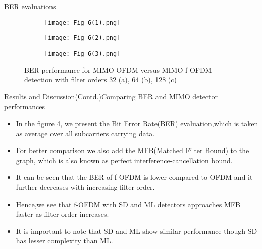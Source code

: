 \documentclass{beamer}
\begin{document}
\begin{frame}{BER evaluations}
    \begin{figure}
        \centering
        \begin{subfigure}[b]{0.3\textwidth}
         \centering
         \texttt{[image: Fig 6(1).png]}
         \caption{}
         \label{fig:6(1)}
        \end{subfigure}
        \hfill
        \begin{subfigure}[b]{0.3\textwidth}
         \centering
         \texttt{[image: Fig 6(2).png]}
         \caption{}
         \label{fig:6(2)}
        \end{subfigure}
        \hfill
        \begin{subfigure}[b]{0.3\textwidth}
         \centering
         \texttt{[image: Fig 6(3).png]}
         \caption{}
         \label{fig:6(3)}
        \end{subfigure}
        \caption{BER performance for MIMO OFDM versus MIMO f-OFDM detection with filter orders 32 (a), 64 (b), 128 (c)}
        \label{fig: 6}
    \end{figure}
\end{frame}
\begin{frame}{Results and Discussion(Contd.)}{Comparing BER and MIMO detector performances}
\begin{itemize}
    \item In the figure \ref{fig: 6}, we present the Bit Error Rate(BER) evaluation,which is taken as average over all subcarriers carrying data.
    \item For better comparison we also add the MFB(Matched Filter Bound) to the graph, which is also known as perfect interference-cancellation bound.
    \item It can be seen that the BER of f-OFDM is lower compared to OFDM and it further decreases with increasing filter order.
    \item Hence,we see that f-OFDM with SD and ML detectors approaches MFB faster as filter order increases.
    \item It is important to note that SD and ML show similar performance though SD has lesser complexity than ML. 
\end{itemize}
\end{frame}
\end{document}
